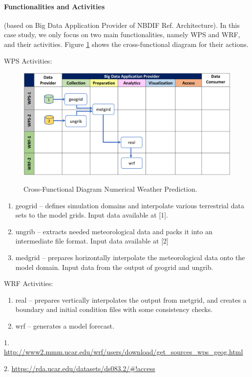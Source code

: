\paragraph*{Functionalities and Activities} (based on Big Data Application Provider of NBDIF Ref. Architecture).
In this case study, we only focus on two main functionalities, namely WPS and WRF, and their activities.
Figure \ref{fig:weather-2} shows the cross-functional diagram for their actions.

WPS Activities:

\begin{figure}[htb]
\includegraphics[width=1.0\textwidth]{usecase/weather.png}
\label{fig:weather-2}
\caption{Cross-Functional Diagram Numerical Weather Prediction.}
\end{figure}

\begin{enumerate}
\item geogrid – defines simulation domains and interpolate various terrestrial data sets to the
model grids. Input data available at [1].
\item ungrib – extracts needed meteorological data and packs it into an intermediate file format.
Input data available at [2]
\item medgrid – prepares horizontally interpolate the meteorological data onto the model domain.
Input data from the output of geogrid and ungrib.
\end{enumerate}

WRF Activities:

\begin{enumerate}
\item real – prepares vertically interpolates the output from metgrid, and creates a boundary and initial
condition files with some consistency checks.
\item wrf – generates a model forecast.

\end{enumerate}


1. \url{http://www2.mmm.ucar.edu/wrf/users/download/get_sources_wps_geog.html}

2. \url{https://rda.ucar.edu/datasets/ds083.2/#!access}
